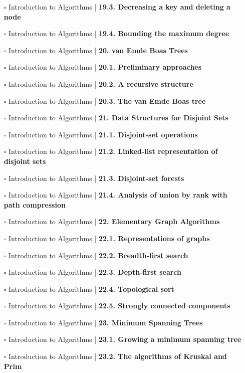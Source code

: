 \documentclass[a4, landscape, 12pt]{article}
\newcommand{\checkbox}{$\square$}%
\begin{document}
\begin{itemize}
{}
\item [\checkbox]  Introduction to Algorithms | \textbf{ 19.3. Decreasing a key and deleting a node
}
\item [\checkbox]  Introduction to Algorithms | \textbf{ 19.4. Bounding the maximum degree
}
\item [\checkbox]  Introduction to Algorithms | \textbf{ 20. van Emde Boas Trees
}
\item [\checkbox]  Introduction to Algorithms | \textbf{ 20.1. Preliminary approaches
}
\item [\checkbox]  Introduction to Algorithms | \textbf{ 20.2. A recursive structure
}
\item [\checkbox]  Introduction to Algorithms | \textbf{ 20.3. The van Emde Boas tree
}
\item [\checkbox]  Introduction to Algorithms | \textbf{ 21. Data Structures for Disjoint Sets
}
\item [\checkbox]  Introduction to Algorithms | \textbf{ 21.1. Disjoint-set operations
}
\item [\checkbox]  Introduction to Algorithms | \textbf{ 21.2. Linked-list representation of disjoint sets
}
\item [\checkbox]  Introduction to Algorithms | \textbf{ 21.3. Disjoint-set forests
}
\item [\checkbox]  Introduction to Algorithms | \textbf{ 21.4. Analysis of union by rank with path compression
}
\item [\checkbox]  Introduction to Algorithms | \textbf{ 22. Elementary Graph Algorithms
}
\item [\checkbox]  Introduction to Algorithms | \textbf{ 22.1. Representations of graphs
}
\item [\checkbox]  Introduction to Algorithms | \textbf{ 22.2. Breadth-first search
}
\item [\checkbox]  Introduction to Algorithms | \textbf{ 22.3. Depth-first search
}
\item [\checkbox]  Introduction to Algorithms | \textbf{ 22.4. Topological sort
}
\item [\checkbox]  Introduction to Algorithms | \textbf{ 22.5. Strongly connected components
}
\item [\checkbox]  Introduction to Algorithms | \textbf{ 23. Minimum Spanning Trees
}
\item [\checkbox]  Introduction to Algorithms | \textbf{ 23.1. Growing a minimum spanning tree
}
\item [\checkbox]  Introduction to Algorithms | \textbf{ 23.2. The algorithms of Kruskal and Prim
}
\end{itemize}
\end{document}
